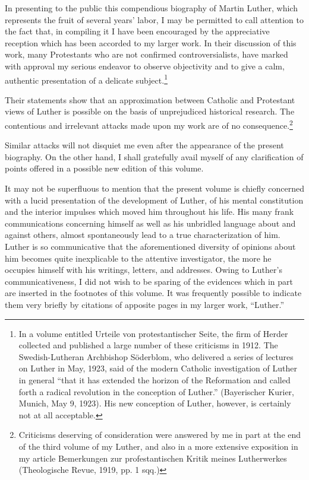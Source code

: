 In presenting to the public this compendious biography of Martin
Luther, which represents the fruit of several years’ labor, I may be
permitted to call attention to the fact that, in compiling it I have
been encouraged by the appreciative reception which has been accorded to my larger work.
In their discussion of this work, many
Protestants who are not confirmed controversialists, have marked
with approval my serious endeavor to observe objectivity and to give
a calm, authentic presentation of a delicate subject.\footnote{
In a volume entitled Urteile von protestantischer Seite, the firm of Herder collected and
published a large number of these criticisms in 1912. The Swedish-Lutheran Archbishop
Söderblom, who delivered a series of lectures on Luther in May, 1923, said of the modern
Catholic investigation of Luther in general “that it has extended the horizon of the Reformation and called forth a radical revolution in the conception of Luther.” (Bayerischer Kurier,
Munich, May 9, 1923). His new conception of Luther, however, is certainly not at all
acceptable.
}

Their statements show that an approximation between Catholic and Protestant
views of Luther is possible on the basis of unprejudiced historical research. The contentious and irrelevant attacks made upon my work
are of no consequence.\footnote{
Criticisms deserving of consideration were answered by me in part at the end of the
third volume of my Luther, and also in a more extensive exposition in my article Bemerkungen zur profestantischen Kritik meines Lutherwerkes (Theologische Revue, 1919, pp. 1 sqq.)
}

Similar attacks will not disquiet me even
after the appearance of the present biography. On the other hand,
I shall gratefully avail myself of any clarification of points offered in
a possible new edition of this volume.

It may not be superfluous to mention that the present volume is
chiefly concerned with a lucid presentation of the development of
Luther, of his mental constitution and the interior impulses which
moved him throughout his life. His many frank communications concerning himself as well as his unbridled language about and against
others, almost spontaneously lead to a true characterization of him.
Luther is so communicative that the aforementioned diversity of
opinions about him becomes quite inexplicable to the attentive investigator, the more he occupies himself with his writings, letters, and
addresses. Owing to Luther’s communicativeness, I did not wish to be
sparing of the evidences which in part are inserted in the footnotes
of this volume. It was frequently possible to indicate them very
briefly by citations of apposite pages in my larger work, “Luther.”

